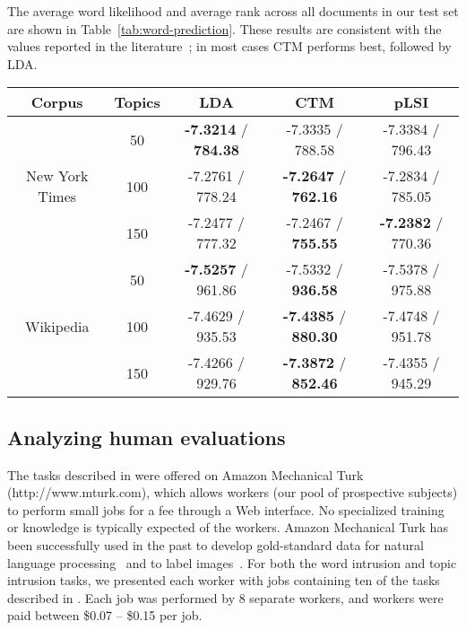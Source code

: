 The average word likelihood and average rank across all documents in
our test set are shown in Table~\ref{tab:word-prediction}.  These
results are consistent with the values reported in the
literature~\cite{blei-03,blei-06}; in most cases CTM performs best,
followed by LDA.

\begin{table*}
  \caption{Two predictive metrics: predictive log likelihood/predictive rank.  Consistent with values reported in the literature, CTM generally performs the best, followed by LDA, then pLSI.  The bold numbers indicate the best performance in each row.}
\label{tab:word-prediction}
\centering
\footnotesize
\begin{sc}
\begin{tabular}{c|c|ccc}
Corpus & Topics & LDA & CTM & pLSI \\
\hline
\multirow{3}{*}{New York Times}
& 50  &  {\bf-7.3214} / {\bf 784.38}  &    -7.3335 / 788.58 & -7.3384 / 796.43\\
& 100 &  -7.2761 / 778.24  & {\bf -7.2647} / {\bf 762.16} & -7.2834 / 785.05 \\
& 150 &  -7.2477 / 777.32  & -7.2467 / {\bf 755.55} & {\bf -7.2382} /  770.36 \\
\hline
\multirow{3}{*}{Wikipedia}
& 50  & {\bf -7.5257} / 961.86 & -7.5332 / {\bf 936.58} & -7.5378 / 975.88 \\
& 100 & -7.4629 / 935.53 & {\bf -7.4385} / {\bf 880.30} & -7.4748 / 951.78 \\
& 150 & -7.4266 / 929.76 & {\bf -7.3872} / {\bf 852.46} & -7.4355 /  945.29 \\
\end{tabular}
\end{sc}
\vspace{0.2in}
\end{table*}

\subsection{Analyzing human evaluations}

The tasks described in  were offered on Amazon
Mechanical Turk (http://www.mturk.com), which allows workers (our pool
of prospective subjects) to perform small jobs for a fee through a Web
interface.  No specialized training or knowledge is typically expected
of the workers.  Amazon Mechanical Turk has been successfully used in
the past to develop gold-standard data for natural language
processing~\cite{snow-08} and to label images~\cite{imagenet-cvpr09}.
For both the word intrusion and topic intrusion tasks, we presented
each worker with jobs containing ten of the tasks described in
.  Each job was performed by 8 separate workers, and
workers were paid between \$0.07 -- \$0.15 per job.


